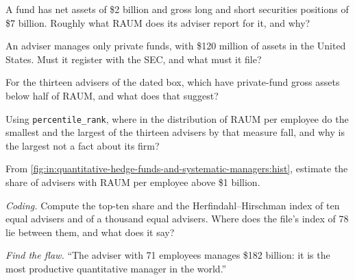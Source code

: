 \begin{exercise}[$\star$]\label{exo:in:quantitative-hedge-funds-and-systematic-managers:2}
A fund has net assets of \$2 billion and gross long and short securities positions of \$7 billion. Roughly what RAUM
does its adviser report for it, and why?
\end{exercise}

\begin{exercise}[$\star$]\label{exo:in:quantitative-hedge-funds-and-systematic-managers:3}
An adviser manages only private funds, with \$120 million of assets in the United States. Must it register with the
SEC, and what must it file?
\end{exercise}

\begin{exercise}[$\star\star$]\label{exo:in:quantitative-hedge-funds-and-systematic-managers:4}
For the thirteen advisers of the dated box, which have private-fund gross assets below half of RAUM, and what does that
suggest?
\end{exercise}

\begin{exercise}[$\star\star$]\label{exo:in:quantitative-hedge-funds-and-systematic-managers:5}
Using \texttt{percentile\_rank}, where in the distribution of RAUM per employee do the smallest and the largest of the
thirteen advisers by that measure fall, and why is the largest not a fact about its firm?
\end{exercise}

\begin{exercise}[$\star\star$]\label{exo:in:quantitative-hedge-funds-and-systematic-managers:6}
From \cref{fig:in:quantitative-hedge-funds-and-systematic-managers:hist}, estimate the share of advisers with RAUM per
employee above \$1 billion.
\end{exercise}

\begin{exercise}[$\star\star\star$]\label{exo:in:quantitative-hedge-funds-and-systematic-managers:7}
\emph{Coding.} Compute the top-ten share and the Herfindahl--Hirschman index of ten equal advisers and of a thousand
equal advisers. Where does the file's index of 78 lie between them, and what does it say?
\end{exercise}

\begin{exercise}[$\star\star\star$]\label{exo:in:quantitative-hedge-funds-and-systematic-managers:8}
\emph{Find the flaw.} ``The adviser with 71 employees manages \$182 billion: it is the most productive quantitative
manager in the world.''
\end{exercise}

